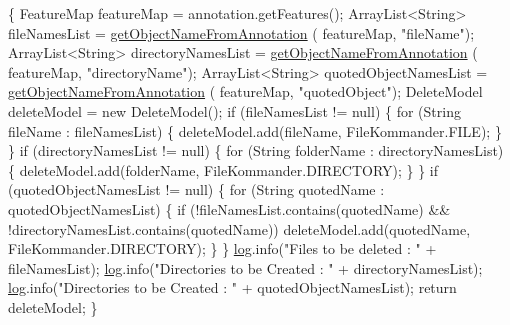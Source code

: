 \begin{DoxyCode}
                                                                               
        \{
        FeatureMap featureMap = annotation.getFeatures();
        ArrayList<String> fileNamesList = \hyperlink{classcom_1_1poly_1_1nlp_1_1filekommander_1_1file_1_1actions_1_1_analyse_action_a8652e1bba48585a8c416e6e212fe4766}{getObjectNameFromAnnotation}
      (
                featureMap, \textcolor{stringliteral}{"fileName"});
        ArrayList<String> directoryNamesList = \hyperlink{classcom_1_1poly_1_1nlp_1_1filekommander_1_1file_1_1actions_1_1_analyse_action_a8652e1bba48585a8c416e6e212fe4766}{getObjectNameFromAnnotation}
      (
                featureMap, \textcolor{stringliteral}{"directoryName"});
        ArrayList<String> quotedObjectNamesList = \hyperlink{classcom_1_1poly_1_1nlp_1_1filekommander_1_1file_1_1actions_1_1_analyse_action_a8652e1bba48585a8c416e6e212fe4766}{getObjectNameFromAnnotation}
      (
                featureMap, \textcolor{stringliteral}{"quotedObject"});
        DeleteModel deleteModel = \textcolor{keyword}{new} DeleteModel();
        \textcolor{keywordflow}{if} (fileNamesList != null) \{
            \textcolor{keywordflow}{for} (String fileName : fileNamesList) \{
                deleteModel.add(fileName, FileKommander.FILE);
            \}
        \}
        \textcolor{keywordflow}{if} (directoryNamesList != null) \{
            \textcolor{keywordflow}{for} (String folderName : directoryNamesList) \{
                deleteModel.add(folderName, FileKommander.DIRECTORY);
            \}
        \}
        \textcolor{keywordflow}{if} (quotedObjectNamesList != null) \{
            \textcolor{keywordflow}{for} (String quotedName : quotedObjectNamesList) \{
                \textcolor{keywordflow}{if} (!fileNamesList.contains(quotedName)
                        && !directoryNamesList.contains(quotedName))
                    deleteModel.add(quotedName, FileKommander.DIRECTORY);
            \}
        \}
        \hyperlink{classcom_1_1poly_1_1nlp_1_1filekommander_1_1file_1_1actions_1_1_analyse_action_ae99df52b353dd7b0d2014d581fcc8cff}{log}.info(\textcolor{stringliteral}{"Files to be deleted : "} + fileNamesList);
        \hyperlink{classcom_1_1poly_1_1nlp_1_1filekommander_1_1file_1_1actions_1_1_analyse_action_ae99df52b353dd7b0d2014d581fcc8cff}{log}.info(\textcolor{stringliteral}{"Directories to be Created : "} + directoryNamesList);
        \hyperlink{classcom_1_1poly_1_1nlp_1_1filekommander_1_1file_1_1actions_1_1_analyse_action_ae99df52b353dd7b0d2014d581fcc8cff}{log}.info(\textcolor{stringliteral}{"Directories to be Created : "} + quotedObjectNamesList);
        \textcolor{keywordflow}{return} deleteModel;
    \}
\end{DoxyCode}
